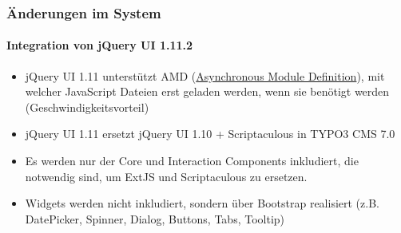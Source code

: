 %

\begin{frame}[fragile]
	\frametitle{Änderungen im System}
	\framesubtitle{Integration von jQuery UI 1.11.2}

	\begin{itemize}
		\item jQuery UI 1.11 unterstützt AMD
			(\href{http://en.wikipedia.org/wiki/Asynchronous_module_definition}{Asynchronous Module Definition}),
			mit welcher JavaScript Dateien erst geladen werden, wenn sie benötigt werden (Geschwindigkeitsvorteil)

    	\item jQuery UI 1.11 ersetzt jQuery UI 1.10 + Scriptaculous in TYPO3 CMS 7.0

    	\item Es werden nur der Core und Interaction Components inkludiert,
    		die notwendig sind, um ExtJS und Scriptaculous zu ersetzen.

    	\item Widgets werden nicht inkludiert, sondern über Bootstrap realisiert\newline
    		(z.B. DatePicker, Spinner, Dialog, Buttons, Tabs, Tooltip)

	\end{itemize}

\end{frame}


